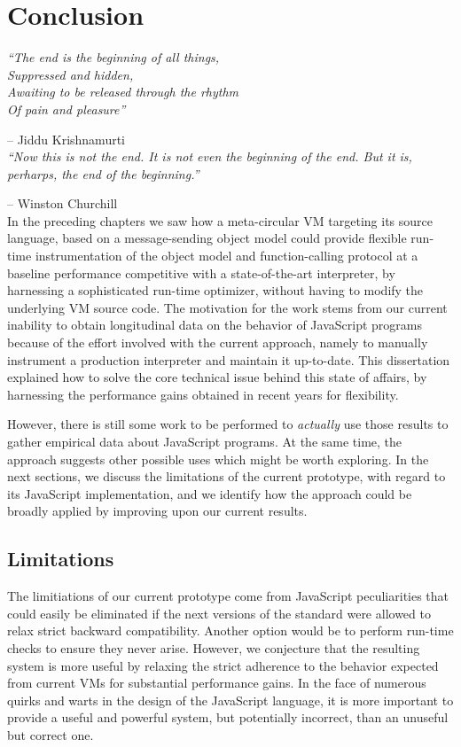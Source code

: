 \chapter{Conclusion}

\emph{``The end is the beginning of all things,\\
        Suppressed and hidden,\\
        Awaiting to be released through the rhythm\\
        Of pain and pleasure''}

-- Jiddu Krishnamurti \\

\emph{``Now this is not the end. It is not even the beginning of the end. But it is, perharps, the end of the beginning.''}

-- Winston Churchill \\


In the preceding chapters we saw how a meta-circular VM targeting its source
language, based on a message-sending object model could provide flexible
run-time instrumentation of the object model and function-calling protocol at a
baseline performance competitive with a state-of-the-art interpreter, by
harnessing a sophisticated run-time optimizer, without having to modify the
underlying VM source code. The motivation for the work stems from our current
inability to obtain longitudinal data on the behavior of JavaScript programs
because of the effort involved with the current approach, namely to manually
instrument a production interpreter and maintain it up-to-date. This
dissertation explained how to solve the core technical issue behind this state
of affairs, by harnessing the performance gains obtained in recent years for
flexibility.

However, there is still some work to be performed to \textit{actually} use
those results to gather empirical data about JavaScript programs. At the same
time, the approach suggests other possible uses which might be worth exploring.
In the next sections, we discuss the limitations of the current prototype, with
regard to its JavaScript implementation, and we identify how the approach could
be broadly applied by improving upon our current results.

\section{Limitations}

The limitiations of our current prototype come from JavaScript peculiarities
that could easily be eliminated if the next versions of the standard were
allowed to relax strict backward compatibility. Another option would be
to perform run-time checks to ensure they never arise.  However, we conjecture
that the resulting system is more useful by relaxing the strict adherence to
the behavior expected from current VMs for substantial performance gains.  In
the face of numerous quirks and warts in the design of the JavaScript language,
it is more important to provide a useful and powerful system, but potentially
incorrect, than an unuseful but correct one.

